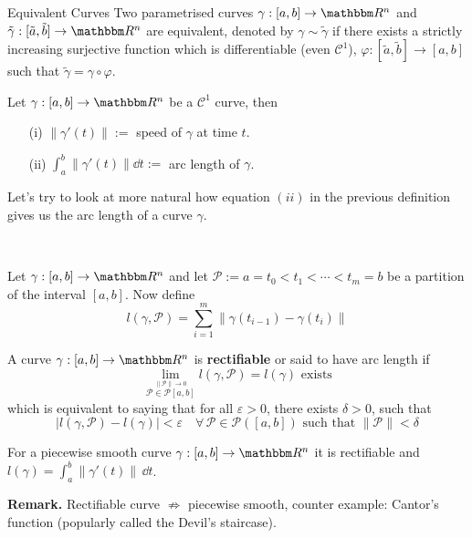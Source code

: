 \documentclass[Analysis-3]{subfiles}
\begin{document}
\begin{Def}{Equivalent Curves}{}
    Two parametrised curves $\gamma : [a,b] \to \R^n$ and $\tilde{\gamma} : [\tilde{a}, \tilde{b}] \to \R^n$ are equivalent, denoted by $\gamma \sim \tilde{\gamma}$ if there exists a strictly increasing surjective function which is differentiable (even $\mathscr{C}^1$), $\varphi : [\tilde{a},\tilde{b}] \to [a,b]$ such that $\tilde{\gamma} = \gamma \circ \varphi$.
\end{Def}

\begin{Def}{}{}
    Let $\gamma : [a,b] \to \R^n$ be a $\mathscr{C}^1$ curve, then 
    \begin{enumerate}
        \item[(i)] $\| \gamma'(t) \| :=$ speed of $\gamma$ at time $t$. 
        \item[(ii)] $\int_a^b \| \gamma'(t) \| \dd t :=$ arc length of $\gamma$.    
    \end{enumerate}
\end{Def}

Let's try to look at more natural how equation $(ii)$ in the previous definition gives us the arc length of a curve $\gamma$. 

\ 

Let $\gamma : [a,b] \to \R^n$ and let $\mathcal{P} := a = t_0 < t_1 < \cdots < t_m = b $ be a partition of the interval $[a,b]$. Now define 
\[
    l(\gamma,\mathcal{P}) = \sum_{i=1}^m \| \gamma(t_{i-1}) - \gamma(t_i) \|     
\]

\begin{Def}{}{}
    A curve $\gamma : [a,b] \to \R^n$ is \textbf{rectifiable} or said to have arc length if 
    \[
        \lim_{\overset{\|\mathcal{P}\| \to 0}{\mathcal{P} \in \mathscr{P}[a,b]}} l(\gamma,\mathcal{P}) = l(\gamma) \mbox{ exists}    
    \]
    which is equivalent to saying that for all $\varepsilon > 0$, there exists $\delta >0$, such that 
    \[
        |l(\gamma,\mathcal{P}) - l(\gamma)| < \varepsilon \quad \forall \, \mathcal{P} \in \mathscr{P}([a,b]) \mbox{ such that } \| \mathcal{P} \| < \delta    
    \]
\end{Def}

\begin{Thm}{}{}\label{thm1:22}
    For a piecewise smooth curve $\gamma : [a,b] \to \R^n$ it is rectifiable and $l(\gamma) = \int_a^b \| \gamma'(t) \| \, \dd t $. 
\end{Thm}
\textbf{Remark.} Rectifiable curve $\not\Rightarrow$ piecewise smooth, counter example: Cantor's function (popularly called the Devil's staircase).  
\end{document}
